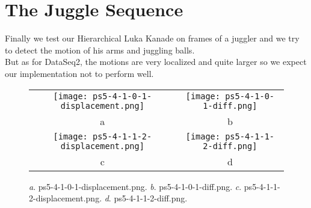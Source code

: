\documentclass[a4paper,11pt]{article}
\begin{document}
\section{The Juggle Sequence}

Finally we test our Hierarchical Luka Kanade on frames of a juggler and we try to detect the motion of his arms and juggling balls.\\
But as for DataSeq2, the motions are very localized and quite larger so we expect our implementation not to perform well.

\begin{figure}[H]
\begin{center}
\begin{tabular}{cc}
	\texttt{[image: ps5-4-1-0-1-displacement.png]}&
	\texttt{[image: ps5-4-1-0-1-diff.png]}\\
	a&b\\
	\texttt{[image: ps5-4-1-1-2-displacement.png]}&
	\texttt{[image: ps5-4-1-1-2-diff.png]}\\
	c&d
\end{tabular}
\end{center}
\caption{ 
\textit{a}. ps5-4-1-0-1-displacement.png.  \textit{b}. ps5-4-1-0-1-diff.png. \textit{c}. ps5-4-1-1-2-displacement.png.  \textit{d}. ps5-4-1-1-2-diff.png. }
\label{ps-5-7}
\end{figure}
\end{document}
